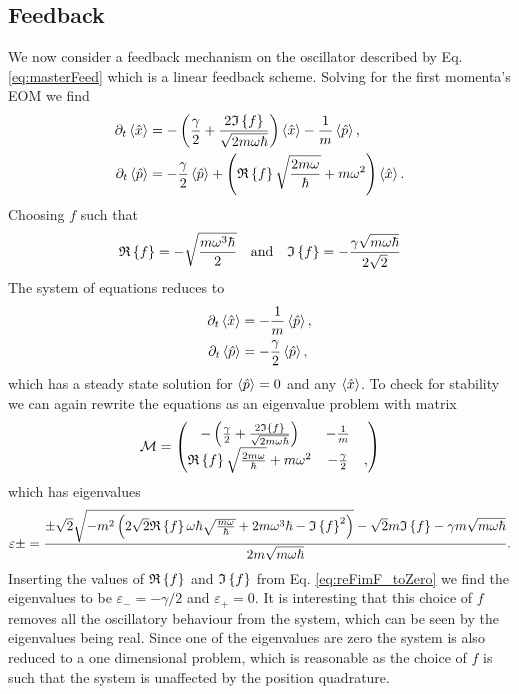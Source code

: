 \subsection{Feedback}
We now consider a feedback mechanism on the oscillator described by Eq. \eqref{eq:masterFeed} which is a linear feedback scheme. Solving for the first momenta's EOM we find 
\begin{align}
    \partial_t\expval{\hat{x}} &= - \left(\frac{\gamma}{2} + \frac{2 \mathfrak{I}\left\{f\right\}}{\sqrt{2 m \omega \hbar}} \right)\expval{\hat{x}} - \frac{1}{m} \expval{\hat{p}},\\
    \partial_t\expval{\hat{p}} &= -\frac{\gamma}{2}\expval{\hat{p}} + \left(\mathfrak{R}\left\{f\right\} \sqrt{\frac{2 m \omega}{\hbar}} + m \omega^2 \right) \expval{\hat{x}}.
\end{align}
Choosing $f$ such that
\begin{equation}
    \mathfrak{R}\left\{f\right\} = - \sqrt{\frac{m \omega^3 \hbar}{2}} \quad \text{and} \quad \mathfrak{I}\left\{f\right\} = -\frac{\gamma\sqrt{m\omega\hbar}}{2\sqrt{2}} \label{eq:reFimF_toZero}
\end{equation}
The system of equations reduces to
\begin{align}
    \partial_t\expval{\hat{x}} &= - \frac{1}{m} \expval{\hat{p}},\\
    \partial_t\expval{\hat{p}} &= -\frac{\gamma}{2} \expval{\hat{p}},
\end{align}
which has a steady state solution for $\expval{\hat{p}} = 0$ and any $\expval{\hat{x}}$. To check for stability we can again rewrite the equations as an eigenvalue problem with matrix
\begin{equation}
    \mathcal{M} = 
    \begin{pmatrix}
        - \left(\frac{\gamma}{2} + \frac{2 \mathfrak{I}\left\{f\right\}}{\sqrt{2 m \omega \hbar}} \right) & - \frac{1}{m} \\
         \mathfrak{R}\left\{f\right\} \sqrt{\frac{2 m \omega}{\hbar}} + m \omega^2 & -\frac{\gamma}{2} &, 
    \end{pmatrix} 
\end{equation}
which has eigenvalues
\begin{equation}
    \varepsilon\pm = \frac{\pm \sqrt{2} \sqrt{ -m^2 \left( 2 \sqrt{2} \mathfrak{R}\left\{f\right\} \omega \hbar \sqrt{\frac{m\omega}{\hbar}} + 2 m \omega^3 \hbar - \mathfrak{I}\left\{f\right\}^2 \right) } -\sqrt{2} m \mathfrak{I}\left\{f\right\} - \gamma m \sqrt{m \omega \hbar} }{ 2 m \sqrt{ m \omega \hbar}}. \label{eq:eigenvalueFirstMomenta}
\end{equation}
Inserting the values of $\mathfrak{R}\left\{f\right\}$ and $\mathfrak{I}\left\{f\right\}$ from Eq. \eqref{eq:reFimF_toZero} we find the eigenvalues to be $\varepsilon_- = -\gamma /2$ and $\varepsilon_+ = 0$. It is interesting that this choice of $f$ removes all the oscillatory behaviour from the system, which can be seen by the eigenvalues being real. Since one of the eigenvalues are zero the system is also reduced to a one dimensional problem, which is reasonable as the choice of $f$ is such that the system is unaffected by the position quadrature.

